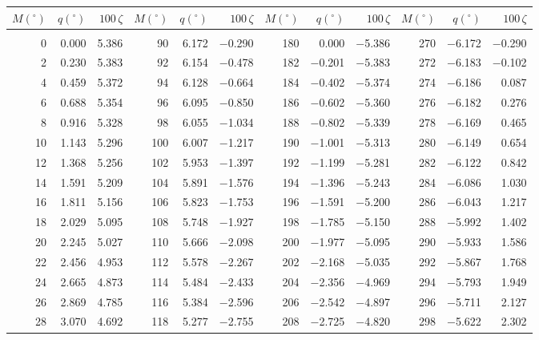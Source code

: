 \clearpage
\begin{table}[!h]\centering
\vspace{0.25cm}
\scriptsize{ \begin{tabular}{rrr|rrr|rrr|rrr}
$M(^\circ)$ & $q(^\circ)$  & $100\,\zeta$ & $M(^\circ)$ & $q(^\circ)$  & $100\,\zeta$ & $M(^\circ)$ & $q(^\circ)$  & $100\,\zeta$& $M(^\circ)$ & $q(^\circ)$  & $100\,\zeta$\\\hline
&&&&&&&&&&&\\[-1.75ex]
  0 &   0.000 &  5.386 &  90 &   6.172 & $-$0.290 & 180 &   0.000 & $-$5.386 & 270 &  $-$6.172 & $-$0.290\\
  2 &   0.230 &  5.383 &  92 &   6.154 & $-$0.478 & 182 &  $-$0.201 & $-$5.383 & 272 &  $-$6.183 & $-$0.102\\
  4 &   0.459 &  5.372 &  94 &   6.128 & $-$0.664 & 184 &  $-$0.402 & $-$5.374 & 274 &  $-$6.186 &  0.087\\
  6 &   0.688 &  5.354 &  96 &   6.095 & $-$0.850 & 186 &  $-$0.602 & $-$5.360 & 276 &  $-$6.182 &  0.276\\
  8 &   0.916 &  5.328 &  98 &   6.055 & $-$1.034 & 188 &  $-$0.802 & $-$5.339 & 278 &  $-$6.169 &  0.465\\
 10 &   1.143 &  5.296 & 100 &   6.007 & $-$1.217 & 190 &  $-$1.001 & $-$5.313 & 280 &  $-$6.149 &  0.654\\
 12 &   1.368 &  5.256 & 102 &   5.953 & $-$1.397 & 192 &  $-$1.199 & $-$5.281 & 282 &  $-$6.122 &  0.842\\
 14 &   1.591 &  5.209 & 104 &   5.891 & $-$1.576 & 194 &  $-$1.396 & $-$5.243 & 284 &  $-$6.086 &  1.030\\
 16 &   1.811 &  5.156 & 106 &   5.823 & $-$1.753 & 196 &  $-$1.591 & $-$5.200 & 286 &  $-$6.043 &  1.217\\
 18 &   2.029 &  5.095 & 108 &   5.748 & $-$1.927 & 198 &  $-$1.785 & $-$5.150 & 288 &  $-$5.992 &  1.402\\
 20 &   2.245 &  5.027 & 110 &   5.666 & $-$2.098 & 200 &  $-$1.977 & $-$5.095 & 290 &  $-$5.933 &  1.586\\
 22 &   2.456 &  4.953 & 112 &   5.578 & $-$2.267 & 202 &  $-$2.168 & $-$5.035 & 292 &  $-$5.867 &  1.768\\
 24 &   2.665 &  4.873 & 114 &   5.484 & $-$2.433 & 204 &  $-$2.356 & $-$4.969 & 294 &  $-$5.793 &  1.949\\
 26 &   2.869 &  4.785 & 116 &   5.384 & $-$2.596 & 206 &  $-$2.542 & $-$4.897 & 296 &  $-$5.711 &  2.127\\
 28 &   3.070 &  4.692 & 118 &   5.277 & $-$2.755 & 208 &  $-$2.725 & $-$4.820 & 298 &  $-$5.622 &  2.302\\

\end{tabular}}
\end{table}
